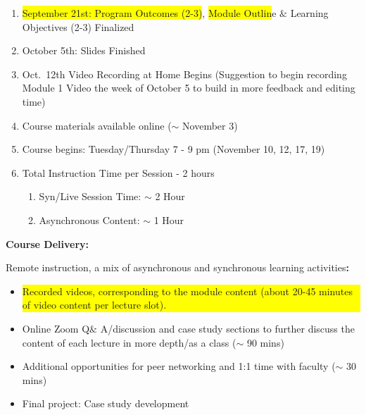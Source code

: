 \documentclass[12pt]{article}
\renewcommand{\_}{\kern-1.5pt\textunderscore\kern-1.5pt}
\begin{document}
\begin{enumerate}
	\item \colorbox{Yellow}{September 21st: Program Outcomes (2-3)}, \colorbox{Yellow}{Module Outlin}e $\&$  Learning Objectives (2-3) Finalized \par

	\item October 5th: Slides Finished \par

	\item Oct.\ 12th Video Recording at Home Begins (Suggestion to begin recording Module 1 Video the week of October 5 to build in more feedback and editing time)  \par

	\item Course materials available online ($ \sim $  November 3)\par

	\item Course begins: Tuesday/Thursday 7 - 9 pm (November 10, 12, 17, 19) \par

	\item Total Instruction Time per Session - 2 hours \par

\begin{enumerate}
	\item Syn/Live Session Time: $ \sim $  2 Hour \par

\setlength{\parskip}{9.96pt}
	\item Asynchronous Content: $ \sim $  1 Hour\textbf{ \textcolor[HTML]{500050}{ }}
\end{enumerate}
\end{enumerate}\par

\textbf{Course Delivery: }\par

Remote instruction, a mix of asynchronous and synchronous learning activities\textbf{: }\par

\begin{itemize}
	\item \colorbox{Yellow}{\parbox{\linewidth}{Recorded videos, corresponding to the module content (about 20-45 minutes of video content per lecture slot).}}\par

	\item Online Zoom Q$\&$ A/discussion and case study sections to further discuss the content of each lecture in more depth/as a class ($ \sim $  90 mins)\par

	\item Additional opportunities for peer networking and 1:1 time with faculty ($ \sim $  30 mins)\par

	\item Final project: Case study development 
\end{itemize}\par
\end{document}

